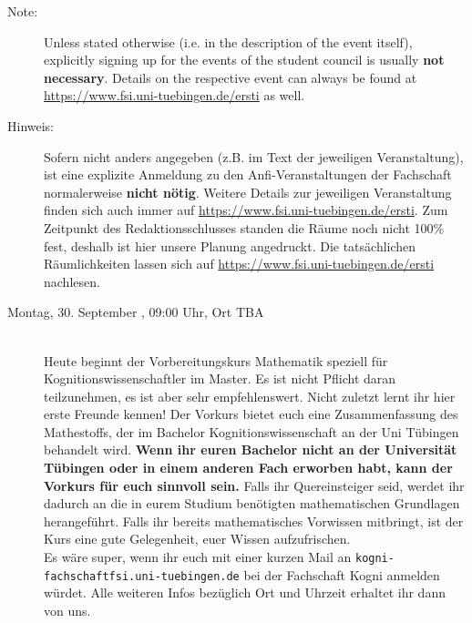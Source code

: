 \begin{description}
  \ifml
    \item[Note:] Unless stated otherwise (i.e. in the description of the event itself), explicitly signing up for the events of the student council is usually \textbf{not necessary}. Details on the respective event can always be found at \url{https://www.fsi.uni-tuebingen.de/ersti} as well.
  \else
    \item[Hinweis:] Sofern nicht anders angegeben (z.B. im Text der jeweiligen Veranstaltung), ist eine explizite Anmeldung zu den Anfi-Veranstaltungen der Fachschaft normalerweise \textbf{nicht nötig}. Weitere Details zur jeweiligen Veranstaltung finden sich auch immer auf \url{https://www.fsi.uni-tuebingen.de/ersti}.
        Zum Zeitpunkt des Redaktionsschlusses standen die Räume noch nicht 100\% fest, deshalb ist hier unsere Planung angedruckt. Die tatsächlichen Räumlichkeiten lassen sich auf \url{https://www.fsi.uni-tuebingen.de/ersti} nachlesen.
  \fi

\ifkogwiss
    \ifmaster
        \item[Montag, 30. September \YEAR, 09:00 Uhr, Ort TBA ]\ \\
        Heute beginnt der Vorbereitungskurs Mathematik speziell für Kognitionswissenschaftler im Master. Es ist nicht Pflicht daran teilzunehmen, es ist aber sehr empfehlenswert. Nicht zuletzt lernt ihr hier erste Freunde kennen! Der Vorkurs bietet euch eine Zusammenfassung des Mathestoffs, der im Bachelor Kognitionswissenschaft an der Uni Tübingen behandelt wird.
        \textbf{Wenn ihr euren Bachelor nicht an der Universität Tübingen oder in einem anderen Fach erworben habt, kann der Vorkurs für euch sinnvoll sein.} Falls ihr Quereinsteiger seid, werdet ihr dadurch an die in eurem Studium benötigten mathematischen Grundlagen herangeführt. Falls ihr bereits mathematisches Vorwissen mitbringt, ist der Kurs eine gute Gelegenheit, euer Wissen aufzufrischen.\\
         Es wäre super, wenn ihr euch mit einer kurzen Mail an \texttt{kogni-fachschaft\At fsi.uni-tuebingen.de} bei der Fachschaft Kogni anmelden würdet. Alle weiteren Infos bezüglich Ort und Uhrzeit erhaltet ihr dann von uns.\\

%
%
    \fi
\fi


\end{description}
